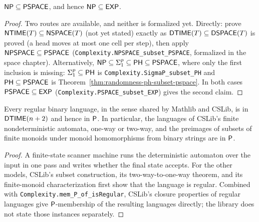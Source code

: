 \begin{theorem}
  \label{thm:polytime-np-subset-pspace}
  $\mathsf{NP} \subseteq \mathsf{PSPACE}$, and hence $\mathsf{NP} \subseteq \mathsf{EXP}$.
\end{theorem}
\begin{proof}
  Two routes are available, and neither is formalized yet. Directly: prove
  $\mathsf{NTIME}(T) \subseteq \mathsf{NSPACE}(T)$ (not yet stated) exactly as
  $\mathsf{DTIME}(T) \subseteq \mathsf{DSPACE}(T)$ is proved (a head moves at most one
  cell per step), then apply $\mathsf{NPSPACE} \subseteq \mathsf{PSPACE}$
  (\texttt{Complexity.NPSPACE\_subset\_PSPACE}, formalized in the space
  chapter). Alternatively, $\mathsf{NP} \subseteq \Sigma^p_1 \subseteq \mathsf{PH}
  \subseteq \mathsf{PSPACE}$, where only the first inclusion is missing:
  $\Sigma^p_1 \subseteq \mathsf{PH}$ is \texttt{Complexity.SigmaP\_subset\_PH} and
  $\mathsf{PH} \subseteq \mathsf{PSPACE}$ is Theorem~\ref{thm:randomness-ph-subset-pspace}.
  In both cases $\mathsf{PSPACE} \subseteq \mathsf{EXP}$
  (\texttt{Complexity.PSPACE\_subset\_EXP}) gives the second claim.
\end{proof}

\begin{theorem}
  \label{thm:polytime-regular-in-P}
  \leanok
  Every regular binary language, in the sense shared by Mathlib and CSLib, is in
  $\mathsf{DTIME}(n + 2)$ and hence in $\mathsf{P}$. In particular, the languages of
  CSLib's finite nondeterministic automata, one-way or two-way, and the
  preimages of subsets of finite monoids under monoid homomorphisms from binary
  strings are in $\mathsf{P}$.
\end{theorem}
\begin{proof}
  \leanok
  A finite-state scanner machine runs the deterministic automaton over the
  input in one pass and writes whether the final state accepts. For the other
  models, CSLib's subset construction, its two-way-to-one-way theorem, and its
  finite-monoid characterization first show that the language is regular.
  Combined with \texttt{Complexity.mem\_P\_of\_isRegular}, CSLib's closure
  properties of regular languages give $\mathsf{P}$-membership of the resulting
  languages directly; the library does not state those instances separately.
\end{proof}

